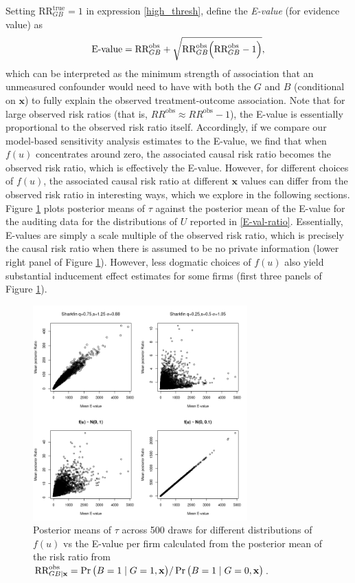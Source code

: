 \documentclass[aoas,preprint, 11pt, dvipsnames, table, x11name]{imsart}
\renewcommand{\bm}[1]{\mathbf{#1}}
\theoremstyle{remark}
\begin{document}
Setting $\text{RR}_{GB}^{\text{true}}=1$ in expression \ref{high_thresh}, \cite{Peng-2016} define the {\em E-value} (for evidence value) as
\begin{equation}
	\text{E-value} = \text{RR}^{\text{obs}}_{GB}+\sqrt{\text{RR}^{\text{obs}}_{GB}\qty(\text{RR}^{\text{obs}}_{GB}-1)},
	\label{eval_full}
\end{equation} 
which can be interpreted as the minimum strength of association that an unmeasured confounder would need to have with both the $G$ and $B$ (conditional on $\bm{x}$) to fully explain the observed treatment-outcome association. Note that for large observed risk ratios (that is, $RR^{\text{obs}} \approx RR^{\text{obs}} - 1$), the E-value is essentially proportional to the observed risk ratio itself. Accordingly, if we compare our model-based sensitivity analysis estimates to the E-value, we find that when $f(u)$ concentrates around zero, the associated causal risk ratio becomes the observed risk ratio, which is effectively the E-value. However, for different choices of $f(u)$, the associated causal risk ratio at different $\bm{x}$ values can differ from the observed risk ratio in interesting ways, which we explore in the following sections. Figure \ref{E-val-ratio_audit} plots posterior means of $\tau$ against the posterior mean of the E-value for the auditing data for the distributions of $U$ reported in \ref{E-val-ratio}. Essentially, E-values are simply a scale multiple of the observed risk ratio, which is precisely the causal risk ratio when there is assumed to be no private information (lower right panel of Figure \ref{E-val-ratio_audit}). However, less dogmatic choices of $f(u)$ also yield substantial inducement effect estimates for some firms (first three panels of Figure \ref{E-val-ratio_audit}).
\begin{figure}[h]
	\centering

	\includegraphics[height=8.25cm]{Eval_vs_U_ratio_constrained_png}

	\caption[E-val vs ratio]{  Posterior means of $\tau$ across 500 draws for different distributions of $f(u)$ vs the E-value per firm calculated from the posterior mean of the risk ratio from $\text{RR}^{\text{obs}}_{GB\mid \bm{x}}=\Pr\qty(B=1\mid G=1, \bm{x})/\Pr\qty(B=1\mid G=0, \bm{x})$. }
	\label{E-val-ratio_audit}
	
\end{figure}
\end{document}
